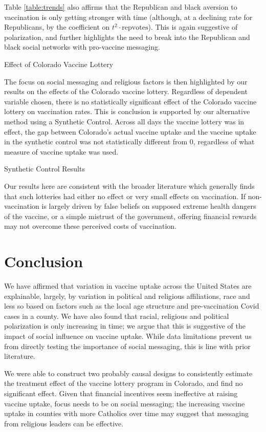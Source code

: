 \documentclass[12pt]{article}
\begin{document}
\begin{spacing}{1.5}
		Table \ref{table:trends} also affirms that the Republican and black aversion to vaccination is only getting stronger with time (although, at a declining rate for Republicans, by the coefficient on $t^2\cdot \textrm{repvotes}$). This is again suggestive of polarization, and further highlights the need to break into the Republican and black social networks with pro-vaccine messaging.
		
		\begin{table}
			\centering
			\caption{Effect of Colorado Vaccine Lottery}
			\centerline{}
			\label{table:didresults}
		\end{table}
		
		The focus on social messaging and religious factors is then highlighted by our results on the effects of the Colorado vaccine lottery. Regardless of dependent variable chosen, there is no statistically significant effect of the Colorado vaccine lottery on vaccination rates. This is conclusion is supported by our alternative method using a Synthetic Control. Across all days the vaccine lottery was in effect, the gap between Colorado's actual vaccine uptake and the vaccine uptake in the synthetic control was not statistically different from 0, regardless of what measure of vaccine uptake was used.
		
		\begin{table}
			\caption{Synthetic Control Results}
			
		\end{table}
		
		Our results here are consistent with the broader literature which generally finds that such lotteries had either no effect or very small effects on vaccination. If non-vaccination is largely driven by false beliefs on supposed extreme health dangers of the vaccine, or a simple mistrust of the government, offering financial rewards may not overcome these perceived costs of vaccination.
		
		\section{Conclusion}
		We have affirmed that variation in vaccine uptake across the United States are explainable, largely, by variation in political and religious affiliations, race and less so based on factors such as the local age structure and pre-vaccination Covid cases in a county. We have also found that racial, religious and political polarization is only increasing in time; we argue that this is suggestive of the impact of social influence on vaccine uptake. While data limitations prevent us from directly testing the importance of social messaging, this is line with prior literature.
		
		We were able to construct two probably causal designs to consistently estimate the treatment effect of the vaccine lottery program in Colorado, and find no significant effect. Given that financial incentives seem ineffective at raising vaccine uptake, focus needs to be on social messaging; the increasing vaccine uptake in counties with more Catholics over time may suggest that messaging from religious leaders can be effective.
		
	\end{spacing}
\end{document}
